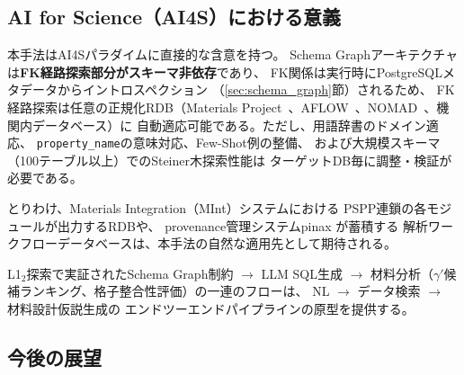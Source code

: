 \documentclass[5p,twocolumn]{elsarticle}
\begin{document}
\subsection{AI for Science（AI4S）における意義}
\label{sec:ai4s}

本手法はAI4Sパラダイムに直接的な含意を持つ。
Schema Graphアーキテクチャは\textbf{FK経路探索部分がスキーマ非依存}であり、
FK関係は実行時にPostgreSQLメタデータからイントロスペクション
（\ref{sec:schema_graph}節）されるため、
FK経路探索は任意の正規化RDB（Materials Project~\citep{jain2013mp}、AFLOW~\citep{curtarolo2012aflow}、NOMAD~\citep{draxl2019nomad}、機関内データベース）に
自動適応可能である。ただし、用語辞書のドメイン適応、
\texttt{property\_name}の意味対応、Few-Shot例の整備、
および大規模スキーマ（100テーブル以上）でのSteiner木探索性能は
ターゲットDB毎に調整・検証が必要である。

とりわけ、Materials Integration（MInt）システム\cite{minamoto2020mint}における
PSPP連鎖の各モジュールが出力するRDBや、
provenance管理システムpinax \cite{minamoto2026pinax}が蓄積する
解析ワークフローデータベースは、本手法の自然な適用先として期待される。

L1$_2$探索で実証されたSchema Graph制約 $\to$ LLM SQL生成 $\to$
材料分析（$\gamma'$候補ランキング、格子整合性評価）の一連のフローは、
NL $\to$ データ検索 $\to$ 材料設計仮説生成の
エンドツーエンドパイプラインの原型を提供する。

\subsection{今後の展望}
\end{document}
